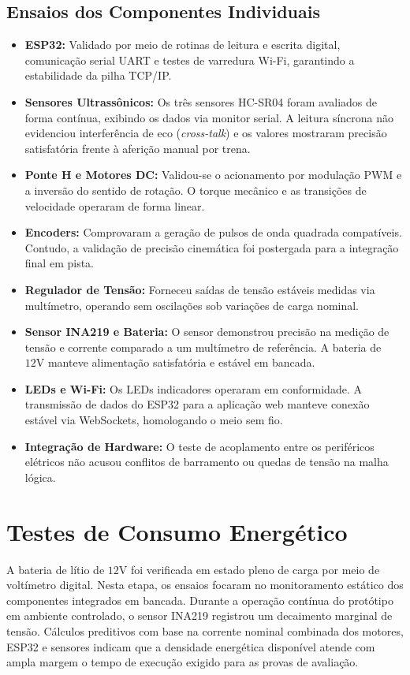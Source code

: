 \subsection{Ensaios dos Componentes Individuais}
\begin{itemize}
    \item \textbf{ESP32:} Validado por meio de rotinas de leitura e escrita digital, comunicação serial UART e testes de varredura Wi-Fi, garantindo a estabilidade da pilha TCP/IP.
    \item \textbf{Sensores Ultrassônicos:} Os três sensores HC-SR04 foram avaliados de forma contínua, exibindo os dados via monitor serial. A leitura síncrona não evidenciou interferência de eco (\textit{cross-talk}) e os valores mostraram precisão satisfatória frente à aferição manual por trena.
    \item \textbf{Ponte H e Motores DC:} Validou-se o acionamento por modulação PWM e a inversão do sentido de rotação. O torque mecânico e as transições de velocidade operaram de forma linear.
    \item \textbf{Encoders:} Comprovaram a geração de pulsos de onda quadrada compatíveis. Contudo, a validação de precisão cinemática foi postergada para a integração final em pista.
    \item \textbf{Regulador de Tensão:} Forneceu saídas de tensão estáveis medidas via multímetro, operando sem oscilações sob variações de carga nominal.
    \item \textbf{Sensor INA219 e Bateria:} O sensor demonstrou precisão na medição de tensão e corrente comparado a um multímetro de referência. A bateria de $12\text{V}$ manteve alimentação satisfatória e estável em bancada.
    \item \textbf{LEDs e Wi-Fi:} Os LEDs indicadores operaram em conformidade. A transmissão de dados do ESP32 para a aplicação web manteve conexão estável via WebSockets, homologando o meio sem fio.
    \item \textbf{Integração de Hardware:} O teste de acoplamento entre os periféricos elétricos não acusou conflitos de barramento ou quedas de tensão na malha lógica.
\end{itemize}

\section{Testes de Consumo Energético}

A bateria de lítio de $12\text{V}$ foi verificada em estado pleno de carga por meio de voltímetro digital. Nesta etapa, os ensaios focaram no monitoramento estático dos componentes integrados em bancada. Durante a operação contínua do protótipo em ambiente controlado, o sensor INA219 registrou um decaimento marginal de tensão. Cálculos preditivos com base na corrente nominal combinada dos motores, ESP32 e sensores indicam que a densidade energética disponível atende com ampla margem o tempo de execução exigido para as provas de avaliação.

